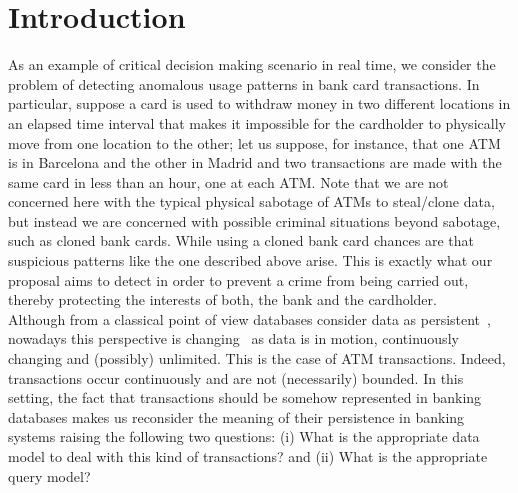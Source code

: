 
\section{Introduction}
\label{sec:intro}
\iffalse
TODO:
\begin{itemize}
    \item Explicar el problema. Soluciones propuestas hasta ahora. Por qué no son suficientes. En qué consiste la nuestra.
    \item Definición general aplicación propuesta. Validez para PoS card fraud or internet frauds (CNP: Card Not Present frauds)... pero que hemos concretado en el caso de los ATM fraud.
    \fmc{Poner aquí contexto sobre los distintos tipos de fraude y sus estadísticas: referencia al informe SEPA ("Seventh report on card fraud typos")}
    \item Explicar cómo está organizado el documento.
\end{itemize}
\fi

As an example of critical decision making scenario in real time, we consider 
the problem of detecting anomalous usage patterns in bank card transactions. 
In particular, suppose a card is used to withdraw money in two different locations 
in an elapsed time interval that makes it impossible for the cardholder to physically 
move from one location to the other; let us suppose, for instance, 
that one ATM is in Barcelona and the other in Madrid and two transactions are made with 
the same card in less than an hour, one at each ATM. 
Note that we are not concerned here with the typical physical sabotage of ATMs to steal/clone data, 
but instead we are concerned with possible criminal situations beyond sabotage, 
such as cloned bank cards. While using a cloned bank card chances are that  
suspicious patterns like the one described above arise. 
This is exactly what our proposal aims to detect in order to prevent a crime from being carried out, 
thereby protecting the interests of both, the bank and the cardholder.\\

Although from a classical point of view databases consider data as persistent~\cite{abiteboul1995foundations}, 
nowadays this perspective is changing~\cite{babu2001continuous,zaniolo2012logical} as data is in motion, continuously changing 
and (possibly) unlimited. 
This is the case of ATM transactions. Indeed, transactions occur continuously and are not
(necessarily) bounded. 
In this setting, the fact that transactions should be somehow represented in banking 
databases makes us reconsider the meaning of their persistence in banking systems 
raising the following two questions: 
(i) What is the appropriate data model to deal with this kind of transactions? 
and (ii) What is the appropriate query model?\\

